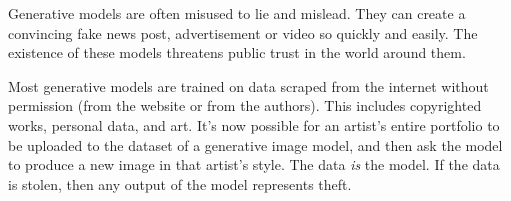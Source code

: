 Generative models are often misused to lie and mislead. They can create a convincing fake news post, advertisement or video so quickly and easily. The existence of these models threatens public trust in the world around them.

Most generative models are trained on data scraped from the internet without permission (from the website or from the authors). This includes copyrighted works, personal data, and art. It's now possible for an artist's entire portfolio to be uploaded to the dataset of a generative image model, and then ask the model to produce a new image in that artist's style. The data \textit{is} the model. If the data is stolen, then any output of the model represents theft.

